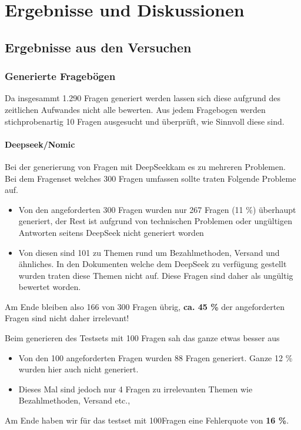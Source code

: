 \chapter{Ergebnisse und Diskussionen}

\section{Ergebnisse aus den Versuchen}

\subsection{Generierte Fragebögen}
Da insgesammt 1.290 Fragen generiert werden lassen sich diese aufgrund des zeitlichen Aufwandes nicht alle bewerten. Aus jedem Fragebogen werden stichprobenartig 10 Fragen ausgesucht und überprüft, wie Sinnvoll diese sind.

\subsubsection{Deepseek/Nomic}

Bei der generierung von Fragen mit DeepSeekkam es zu mehreren Problemen.\\
Bei dem Fragenset welches 300 Fragen umfassen sollte traten Folgende Probleme auf.
\begin{itemize}
    \item Von den angeforderten 300 Fragen wurden nur 267 Fragen (11 \%) überhaupt generiert, der Rest ist aufgrund von technischen Problemen oder ungültigen Antworten seitens DeepSeek nicht generiert worden
    \item Von diesen sind 101 zu Themen rund um Bezahlmethoden, Versand und ähnliches. In den Dokumenten welche dem DeepSeek zu verfügung gestellt wurden traten diese Themen nicht auf. Diese Fragen sind daher als ungültig bewertet worden.
\end{itemize}

Am Ende bleiben also 166 von 300 Fragen übrig, \textbf{ca. 45 \%} der angeforderten Fragen sind nicht daher irrelevant!

Beim generieren des Testsets mit 100 Fragen sah das ganze etwas besser aus
\begin{itemize}
    \item Von den 100 angeforderten Fragen wurden 88 Fragen generiert. Ganze 12 \% wurden hier auch nicht generiert.
    \item Dieses Mal sind jedoch nur 4 Fragen zu irrelevanten Themen wie Bezahlmethoden, Versand etc.,
\end{itemize}
Am Ende haben wir für das testset mit 100Fragen eine Fehlerquote von \textbf{16 \%}.

